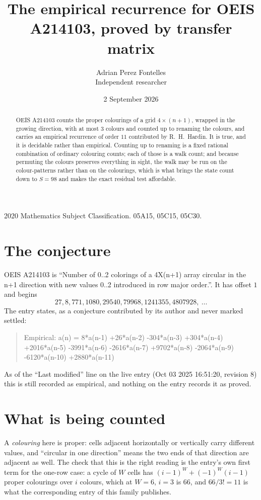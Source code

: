 \documentclass[11pt,a4paper]{article}
\title{The empirical recurrence for OEIS A214103, proved by transfer matrix}
\author{Adrian Perez Fontelles\\ \small Independent researcher}
\date{2 September 2026}
\theoremstyle{plain}
\theoremstyle{definition}
\begin{document}
\maketitle

\begin{abstract}
OEIS A214103 counts the proper colourings of a grid $4\times(n+1)$, wrapped in the growing direction, with at most $3$ colours and
counted up to renaming the colours, and carries an empirical recurrence of order $11$
contributed by R.~H.~Hardin. It is true, and it is decidable rather than empirical. Counting
up to renaming is a fixed rational combination of ordinary colouring counts; each of those is
a walk count; and because permuting the colours preserves everything in sight, the walk may be
run on the colour-patterns rather than on the colourings, which is what brings the state count
down to $S=98$ and makes the exact residual test affordable.
\end{abstract}

\noindent\small 2020 Mathematics Subject Classification. 05A15, 05C15, 05C30.\normalsize

\section{The conjecture}

OEIS A214103 is ``Number of 0..2 colorings of a 4X(n+1) array circular in the n+1 direction with new values 0..2 introduced in row major order.''. It has offset $1$ and begins
\[
27, 8, 771, 1080, 29540, 79968, 1241355, 4807928,\ \dots
\]
The entry states, as a conjecture contributed by its author and never marked settled:
\begin{quote}
Empirical: a(n) = 8*a(n-1) +26*a(n-2) -304*a(n-3) +304*a(n-4) +2016*a(n-5) -3991*a(n-6) -2616*a(n-7) +9702*a(n-8) -2064*a(n-9) -6120*a(n-10) +2880*a(n-11)
\end{quote}
As of the ``Last modified'' line on the live entry (Oct 03 2025 16:51:20, revision 8) this is still
recorded as empirical, and nothing on the entry records it as proved.

\section{What is being counted}

A \emph{colouring} here is proper: cells adjacent horizontally or vertically carry different
values, and ``circular in one direction'' means the two ends of that direction are adjacent as
well. The check that this is the right reading is the entry's own first term for the
one-row case: a cycle of $W$ cells has $(i-1)^W+(-1)^W(i-1)$ proper colourings over $i$
colours, which at $W=6$, $i=3$ is $66$, and $66/3!=11$ is what the corresponding entry of this
family publishes.
\end{document}
